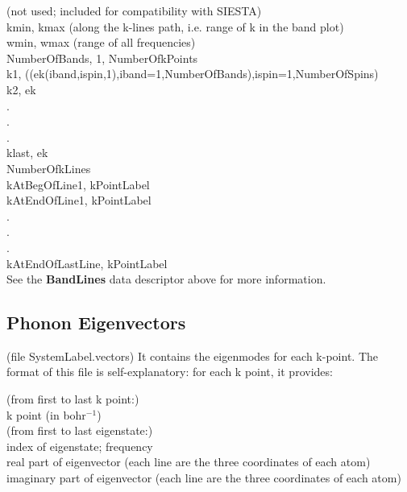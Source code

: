  (not used; included for compatibility with SIESTA)  \\
kmin, kmax (along the k-lines path, i.e. range of k in the band plot) \\
wmin, wmax (range of all frequencies) \\
NumberOfBands, 1, NumberOfkPoints \\
k1, ((ek(iband,ispin,1),iband=1,NumberOfBands),ispin=1,NumberOfSpins) \\
k2, ek \\
 . \\
 . \\
 . \\
klast, ek \\
NumberOfkLines \\
kAtBegOfLine1, kPointLabel \\
kAtEndOfLine1, kPointLabel \\
  . \\
  . \\
  . \\
kAtEndOfLastLine, kPointLabel \\

\noindent
See the {\bf BandLines} data descriptor above for more information.


\subsection{Phonon Eigenvectors}
(file SystemLabel.vectors) 
It contains the eigenmodes for each k-point.
The format of this file is  self-explanatory:
for each k point, it provides:

\noindent
(from first to last k point:) \\
   \indent k point (in bohr$^{-1}$) \\
   \indent (from first to last eigenstate:) \\
    \indent  \indent index of eigenstate; frequency \\
     \indent \indent  real part of eigenvector (each line are the three
       coordinates of each atom)\\
     \indent \indent  imaginary part of eigenvector (each line are the three
    coordinates of each atom)\\





      

